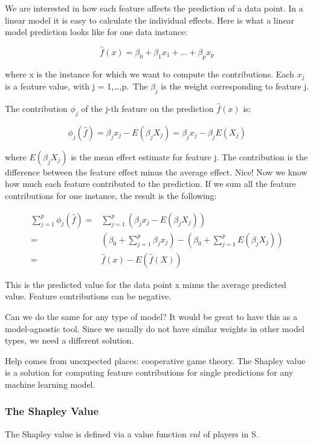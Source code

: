 \documentclass[12pt,]{krantz}
\begin{document}
We are interested in how each feature affects the prediction of a data
point. In a linear model it is easy to calculate the individual effects.
Here is what a linear model prediction looks like for one data instance:

\[\hat{f}(x)=\beta_0+\beta_{1}x_{1}+\ldots+\beta_{p}x_{p}\]

where x is the instance for which we want to compute the contributions.
Each \(x_j\) is a feature value, with j = 1,\ldots{},p.~The \(\beta_j\)
is the weight corresponding to feature j.

The contribution \(\phi_j\) of the j-th feature on the prediction
\(\hat{f}(x)\) is:

\[\phi_j(\hat{f})=\beta_{j}x_j-E(\beta_{j}X_{j})=\beta_{j}x_j-\beta_{j}E(X_{j})\]

where \(E(\beta_jX_{j})\) is the mean effect estimate for feature j. The
contribution is the difference between the feature effect minus the
average effect. Nice! Now we know how much each feature contributed to
the prediction. If we sum all the feature contributions for one
instance, the result is the following:

\begin{align*}\sum_{j=1}^{p}\phi_j(\hat{f})=&\sum_{j=1}^p(\beta_{j}x_j-E(\beta_{j}X_{j}))\\=&(\beta_0+\sum_{j=1}^p\beta_{j}x_j)-(\beta_0+\sum_{j=1}^{p}E(\beta_{j}X_{j}))\\=&\hat{f}(x)-E(\hat{f}(X))\end{align*}

This is the predicted value for the data point x minus the average
predicted value. Feature contributions can be negative.

Can we do the same for any type of model? It would be great to have this
as a model-agnostic tool. Since we usually do not have similar weights
in other model types, we need a different solution.

Help comes from unexpected places: cooperative game theory. The Shapley
value is a solution for computing feature contributions for single
predictions for any machine learning model.

\subsubsection{The Shapley Value}\label{the-shapley-value}

The Shapley value is defined via a value function \(val\) of players in
S.
\end{document}
